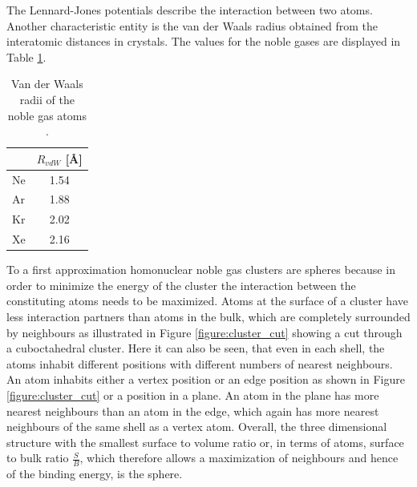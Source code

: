 The Lennard-Jones potentials describe the interaction between two atoms.
Another characteristic entity is the van der Waals radius obtained from
the interatomic distances in crystals. The values for the noble gases
are displayed in Table \ref{table:vdWaalsradii}.

\begin{table}
 \caption{Van der Waals radii of the noble gas atoms \cite{Bondi64}.}
 \centering
 \begin{tabular}{lc}
  \toprule
                & $R_{vdW}$ [\AA] \\
  \midrule
    Ne          & 1.54 \\
    Ar          & 1.88 \\
    Kr          & 2.02 \\
    Xe          & 2.16 \\
  \bottomrule
 \end{tabular}
 \label{table:vdWaalsradii}
\end{table}

To a first approximation homonuclear noble gas clusters are spheres
because in order to minimize
the energy of the cluster the interaction between the constituting atoms needs to be
maximized. Atoms at the surface of a cluster have less interaction
partners than atoms in the bulk, which are completely surrounded by neighbours
as illustrated in Figure \ref{figure:cluster_cut} showing
a cut through a cuboctahedral cluster.
Here it can also be seen, that even in each shell, the atoms inhabit different
positions with different numbers of nearest neighbours.
An atom inhabits either a vertex position or an edge position
as shown in Figure \ref{figure:cluster_cut} or a position in a plane.
An atom
in the plane has more nearest neighbours than an atom in the edge, which again
has more nearest neighbours of the same shell as a vertex atom.
Overall, the three dimensional structure
with the smallest surface to volume ratio or, in terms of atoms, surface to bulk
ratio $\frac{S}{B}$, which therefore allows a maximization of neighbours and
hence of the binding
energy, is the sphere. 



